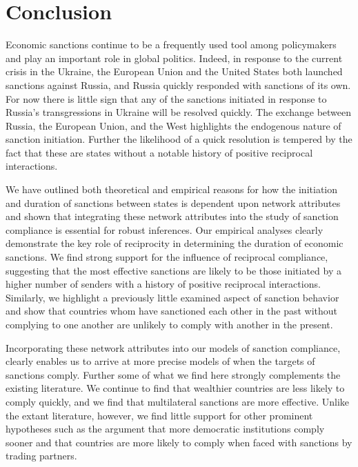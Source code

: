\section*{Conclusion}
\label{conclusion}

Economic sanctions continue to be a frequently used tool among policymakers and play an important role in global politics. Indeed, in response to the current crisis in the Ukraine, the European Union and the United States both launched sanctions against Russia, and Russia quickly responded with sanctions of its own. For now there is little sign that any of the sanctions initiated in response to Russia's transgressions in Ukraine will be resolved quickly. The exchange between Russia, the European Union, and the West highlights the endogenous nature of sanction initiation. Further the likelihood of a quick resolution is tempered by the fact that these are states without a notable history of positive reciprocal interactions. 


We have outlined both theoretical and empirical reasons for how the initiation and duration of sanctions between states is dependent upon network attributes and shown that integrating these network attributes into the study of sanction compliance is essential for robust inferences. Our empirical analyses clearly demonstrate the key role of reciprocity in determining the duration of economic sanctions. We find strong support for the influence of reciprocal compliance, suggesting that the most effective sanctions are likely to be those initiated by a higher number of senders with a history of positive reciprocal interactions. Similarly, we highlight a previously little examined aspect of sanction behavior and show that countries whom have sanctioned each other in the past without complying to one another are unlikely to comply with another in the present. 

Incorporating these network attributes into our models of sanction compliance, clearly enables us to arrive at more precise models of when the targets of sanctions comply. Further some of what we find here strongly complements the existing literature. We continue to find that wealthier countries are less likely to comply quickly, and we find that multilateral sanctions are more effective. Unlike the extant literature, however, we find little support for other prominent hypotheses such as the argument that more democratic institutions comply sooner and that countries are more likely to comply when faced with sanctions by trading partners. 

